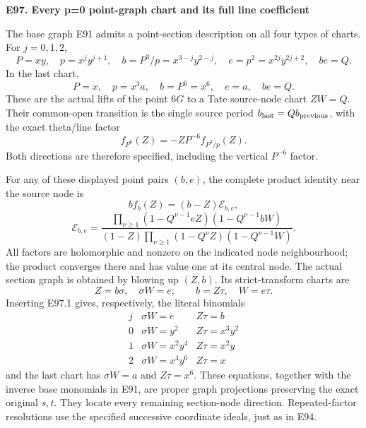 \par

\medskip\noindent\textbf{E97. Every p=0 point-graph chart and its full line coefficient}

\par\nobreak

The base graph E91 admits a point-section description
on all four types of charts. For \(j=0,1,2\),
\[
 P=xy,\quad p=x^jy^{j+1},\quad
 b=P^3/p=x^{3-j}y^{2-j},\quad
 e=p^2=x^{2j}y^{2j+2},\quad be=Q.
 \tag{E97.1}
\]
In the last chart,
\[
 P=x,\quad p=x^3a,\quad b=P^6=x^6,\quad e=a,
 \quad be=Q.                                  \tag{E97.2}
\]
These are the actual lifts of the point \(6G\)
to a Tate source-node chart \(ZW=Q\). Their
common-open transition is the single source period
\(b_{\rm last}=Qb_{\rm previous}\), with the exact
theta/line factor
\[
 f_{P^6}(Z)=-ZP^{-6}f_{P^3/p}(Z).               \tag{E97.3}
\]
Both directions are therefore specified, including
the vertical \(P^{-6}\) factor.

For any of these displayed point pairs \((b,e)\),
the complete product identity near the source node is
\[
 b f_b(Z)=(b-Z)\mathcal E_{b,e},
\]
\[
 \mathcal E_{b,e}=
 \frac{\prod_{\nu\ge1}
 (1-Q^{\nu-1}eZ)(1-Q^{\nu-1}bW)}
 {(1-Z)\prod_{\nu\ge1}
 (1-Q^\nu Z)(1-Q^{\nu-1}W)}.                   \tag{E97.4}
\]
All factors are holomorphic and nonzero on the
indicated node neighbourhood; the product converges
there and has value one at its central node.
The actual section graph is obtained by blowing up
\((Z,b)\). Its strict-transform charts are
\[
 Z=b\sigma,\quad \sigma W=e;\qquad
 b=Z\tau,\quad W=e\tau.                        \tag{E97.5}
\]
Inserting E97.1 gives, respectively, the literal
binomials
\[
\begin{array}{c|c|c}
 j&\sigma W=e& Z\tau=b\\ \hline
 0&\sigma W=y^2&Z\tau=x^3y^2\\
 1&\sigma W=x^2y^4&Z\tau=x^2y\\
 2&\sigma W=x^4y^6&Z\tau=x
\end{array}
\]
and the last chart has \(\sigma W=a\) and
\(Z\tau=x^6\). These equations, together with
the inverse base monomials in E91, are proper graph
projections preserving the exact original \(s,t\).
They locate every remaining section-node direction.
Repeated-factor resolutions use the specified
successive coordinate ideals, just as in E94.

